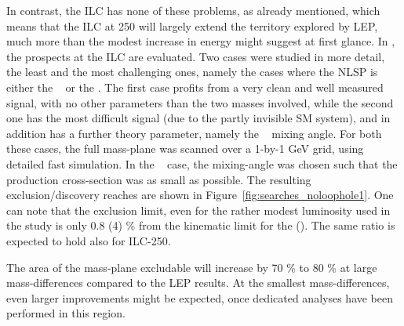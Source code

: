 In contrast, the ILC has none of these problems,
as already mentioned,
which means that the ILC at 250 will largely extend the
territory explored by LEP,
much more than the modest increase in energy might suggest at first glance.
In \cite{Berggren:2013vna},
the prospects at the ILC are evaluated.
Two cases were studied in more detail, 
the least and the most challenging ones, 
namely the cases where the NLSP is either the \smur~
or the \stone .
The first case profits from a very clean and well measured
signal,
with no other parameters than the two masses involved,
while the second one has the most difficult signal 
(due to the partly invisible SM system),
and in addition has a further theory parameter,
namely the \stau~ mixing angle.
For both these cases,
the full mass-plane was scanned over a 1-by-1 GeV grid,
using detailed fast simulation.
In the \stone~ case, the mixing-angle was chosen such that the
production cross-section was as small as possible.
The resulting exclusion/discovery reaches are shown in
Figure~\ref{fig:searches_noloophole1}.
One can note that the exclusion limit,
even for the rather modest luminosity used in the study
is only 0.8 (4) \% from the kinematic limit for the \smur (\stone).
The same ratio is expected to hold also for ILC-250.

The area of the mass-plane excludable will increase
by 70 \% to 80 \% at large mass-differences compared to the LEP results.
At the smallest mass-differences,
even larger improvements might be expected,
once dedicated analyses have been performed in this region.

